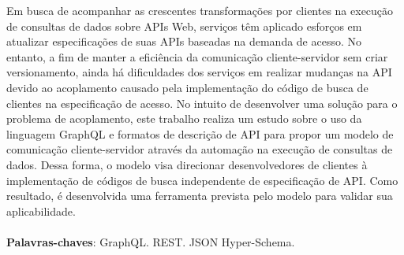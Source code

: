 \begin{resumo}
  Em busca de acompanhar as crescentes transformações por clientes na execução de consultas de dados sobre APIs Web, serviços têm aplicado esforços em atualizar especificações de suas APIs baseadas na demanda de acesso. No entanto, a fim de manter a eficiência da comunicação cliente-servidor sem criar versionamento, ainda há dificuldades dos serviços em realizar mudanças na API devido ao acoplamento causado pela implementação do código de busca de clientes na especificação de acesso. No intuito de desenvolver uma solução para o problema de acoplamento, este trabalho realiza um estudo sobre o uso da linguagem GraphQL e formatos de descrição de API para propor um modelo de comunicação cliente-servidor através da automação na execução de consultas de dados. Dessa forma, o modelo visa direcionar desenvolvedores de clientes à implementação de códigos de busca independente de especificação de API. Como resultado, é desenvolvida uma ferramenta prevista pelo modelo para validar sua aplicabilidade. \\ \\
  \textbf{Palavras-chaves}: GraphQL. REST. JSON Hyper-Schema.
\end{resumo}